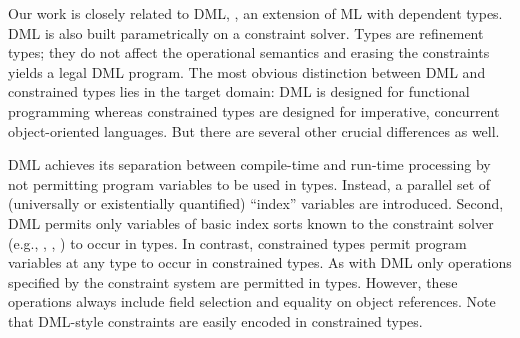 Our work is closely related to DML, \cite{xi99dependent}, an
extension of ML with dependent types. DML is also built
parametrically on a constraint solver. Types are refinement types;
they do not affect the operational semantics and erasing the
constraints yields a legal DML program.
%
The most obvious distinction between DML and constrained types
lies in the target
domain: DML is designed for functional programming
whereas constrained types are designed for imperative, concurrent
object-oriented languages. 
But there are several other
crucial differences as well.

DML achieves its separation between compile-time and run-time processing
by not permitting program
variables to be used in types. Instead, a parallel set of (universally
or existentially quantified) ``index'' variables are
introduced.
%
Second, DML permits only variables of basic index sorts known to
the constraint solver (e.g., , , ) to
occur in types. In contrast, constrained types permit program
variables at any type to occur in constrained types. As with DML
only operations specified by the constraint system are permitted in
types. However, these operations always include field selection and
equality on object references.  Note that DML-style constraints are easily
encoded in constrained types.






